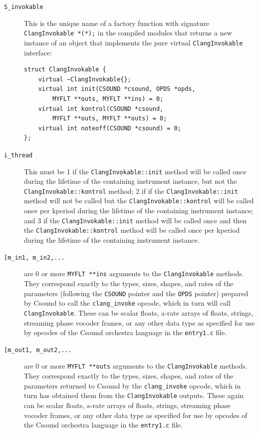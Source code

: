 \documentclass[letterpaper, 12pt]{article}
\begin{document}
\begin{description}
\item[\texttt{S\_invokable}] This is the unique name of a factory function with signature \verb|ClangInvokable *(*);| in the compiled modules that returns a new instance of an object that implements the pure virtual \verb|ClangInvokable| interface:

\begin{Verbatim}[fontfamily=courier, xleftmargin=\parindent]
struct ClangInvokable {
	virtual ~ClangInvokable{};
	virtual int init(CSOUND *csound, OPDS *opds, 
		MYFLT **outs, MYFLT **ins) = 0;
	virtual int kontrol(CSOUND *csound, 
		MYFLT **outs, MYFLT **outs) = 0;
	virtual int noteoff(CSOUND *csound) = 0;
};
\end{Verbatim}

\item[\texttt{i\_thread}] This must be 1 if the \verb|ClangInvokable::init| method will be called once during the lifetime of the containing instrument instance, but not the \verb|ClangInvokable::kontrol| method; 2 if if the \verb|ClangInvokable::init| method will not be called but the \verb|ClangInvokable::kontrol| will be called once per kperiod during the lifetime of the containing instrument instance; and 3 if the \verb|ClangInvokable::init| method will be called once and then the \verb|ClangInvokable::kontrol| method will be called once per kperiod during the lifetime of the containing instrument instance.
\item[\texttt{[m\_in1, m\_in2,...}] are 0 or more \verb|MYFLT **ins| arguments to the \verb|ClangInvokable| methods. They correspond exactly to the types, sizes, shapes, and rates of the parameters (following the \verb|CSOUND| pointer and the \verb|OPDS| pointer) prepared by Csound to call the \verb|clang_invoke| opcode, which in turn will call \verb|ClangInvokable|. These can be scalar floats, a-rate arrays of floats, strings, streaming phase vocoder frames, or any other data type as specified for use by opcodes of the Csound orchestra language in the \verb|entry1.c| \citep{entry1} file.
\item[\texttt{[m\_out1, m\_out2,...}] are 0 or more \verb|MYFLT **outs| arguments to the \verb|ClangInvokable| methods. They correspond exactly to the types, sizes, shapes, and rates of the parameters returned to Csound by the \verb|clang_invoke| opcode, which in turn has obtained them from the \verb|ClangInvokable| outputs. These again can be scalar floats, a-rate arrays of floats, strings, streaming phase vocoder frames, or any other data type as specified for use by opcodes of the Csound orchestra language in the \verb|entry1.c| \citep{entry1} file.
\end{description}
\end{document}
